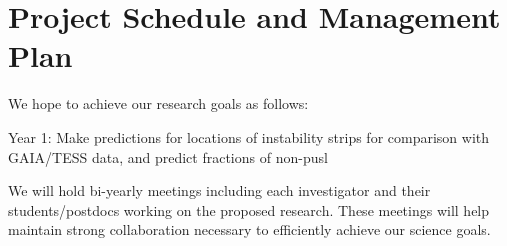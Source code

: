 \section{Project Schedule and Management Plan}

We hope to achieve our research goals as follows:

Year 1: Make predictions for locations of instability strips for comparison with GAIA/TESS data, and predict fractions of non-pusl 

We will  hold bi-yearly meetings including each investigator and their students/postdocs working on the proposed research. These meetings will help maintain strong collaboration necessary to efficiently achieve our science goals.

